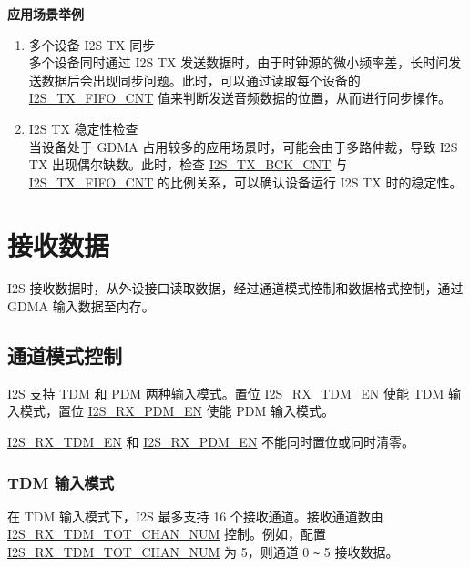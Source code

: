 \documentclass[main\_\_CN.tex]{subfiles}
\begin{document}
\textbf{应用场景举例}
\begin{enumerate}
    \item 多个设备 I2S TX 同步\\
    多个设备同时通过 I2S TX 发送数据时，由于时钟源的微小频率差，长时间发送数据后会出现同步问题。此时，可以通过读取每个设备的 \hyperref[fielddesc:I2STXFIFOCNT]{I2S\_TX\_FIFO\_CNT} 值来判断发送音频数据的位置，从而进行同步操作。
    \item I2S TX 稳定性检查\\
    当设备处于 GDMA 占用较多的应用场景时，可能会由于多路仲裁，导致 I2S TX 出现偶尔缺数。此时，检查 \hyperref[fielddesc:I2STXBCKCNT]{I2S\_TX\_BCK\_CNT} 与 \hyperref[fielddesc:I2STXFIFOCNT]{I2S\_TX\_FIFO\_CNT} 的比例关系，可以确认设备运行 I2S TX 时的稳定性。
\end{enumerate}


\section{接收数据}\label{sec:i2s-rx-data}

I2S 接收数据时，从外设接口读取数据，经过通道模式控制和数据格式控制，通过 GDMA 输入数据至内存。

\subsection{通道模式控制}

\chipname{} I2S 支持 TDM 和 PDM 两种输入模式。置位 \hyperref[fielddesc:I2SRXTDMEN]{I2S\_RX\_TDM\_EN} 使能 TDM 输入模式，置位 \hyperref[fielddesc:I2SRXPDMEN]{I2S\_RX\_PDM\_EN} 使能 PDM 输入模式。

\begin{tiplisting}
\hyperref[fielddesc:I2SRXTDMEN]{I2S\_RX\_TDM\_EN} 和 \hyperref[fielddesc:I2SRXPDMEN]{I2S\_RX\_PDM\_EN} 不能同时置位或同时清零。
\end{tiplisting}
\vspace{-1em}

\subsubsection{TDM 输入模式}

在 TDM 输入模式下，I2S 最多支持 16 个接收通道。接收通道数由 \hyperref[fielddesc:I2SRXTDMTOTCHANNUM]{I2S\_RX\_TDM\_TOT\_CHAN\_NUM} 控制。例如，配置 \hyperref[fielddesc:I2SRXTDMTOTCHANNUM]{I2S\_RX\_TDM\_TOT\_CHAN\_NUM} 为 5，则通道 0 \verb+~+ 5 接收数据。
\end{document}
